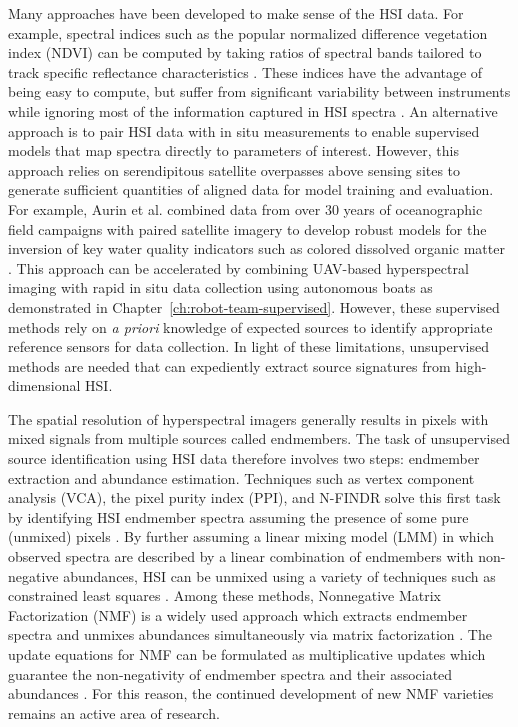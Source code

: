 Many approaches have been developed to make sense of the HSI data. For example,
spectral indices such as the popular normalized difference vegetation index
(NDVI) can be computed by taking ratios of spectral bands tailored to track
specific reflectance characteristics
\cite{thenkabail-indices,thenkabail2018hyperspectral}. These indices have the
advantage of being easy to compute, but suffer from significant variability
between instruments while ignoring most of the information captured in HSI
spectra \cite{ndvi-variability}. An alternative approach is to pair HSI data
with in situ measurements to enable supervised models that map spectra directly
to parameters of interest. However, this approach relies on serendipitous
satellite overpasses above sensing sites to generate sufficient quantities of
aligned data for model training and evaluation. For example, Aurin et al.
combined data from over 30 years of oceanographic field campaigns with paired
satellite imagery to develop robust models for the inversion of key water
quality indicators such as colored dissolved organic matter
\cite{aurin2018remote}. This approach can be accelerated by combining UAV-based
hyperspectral imaging with rapid in situ data collection using autonomous boats
as demonstrated in Chapter~\ref{ch:robot-team-supervised}. However, these
supervised methods rely on \textit{a priori} knowledge of expected sources to
identify appropriate reference sensors for data collection. In light of these
limitations, unsupervised methods are needed that can expediently extract source
signatures from high-dimensional HSI.


The spatial resolution of hyperspectral imagers generally results in pixels with
mixed signals from multiple sources called endmembers. The task of unsupervised
source identification using HSI data therefore involves two steps: endmember
extraction and abundance estimation. Techniques such as vertex component
analysis (VCA), the pixel purity index (PPI), and N-FINDR solve this first task
by identifying HSI endmember spectra assuming the presence of some pure
(unmixed) pixels \cite{vca-orig, ppi-orig, N-FINDR-orig}. By further assuming a
linear mixing model (LMM) in which observed spectra are described by a linear
combination of endmembers with non-negative abundances, HSI can be unmixed using
a variety of techniques such as constrained least squares
\cite{spectral-unmixing-orig, fcls-unmixing}. Among these methods, Nonnegative
Matrix Factorization (NMF) is a widely used approach which extracts endmember
spectra and unmixes abundances simultaneously via matrix factorization
\cite{nmf-orig, unmixing-nmf-review, unmixing-nmf-review-2}. The update
equations for NMF can be formulated as multiplicative updates which guarantee
the non-negativity of endmember spectra and their associated abundances
\cite{nmf-algorithms}.  For this reason, the continued development of new NMF
varieties remains an active area of research.

